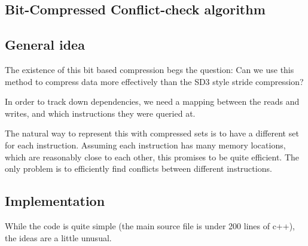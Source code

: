 \documentclass[12pt,twoside]{reedthesis}
\begin{document}
	\subsection{Bit-Compressed Conflict-check algorithm}

		\subsection{General idea}

		The existence of this bit based compression begs the question: Can we use this method to compress data more effectively than the SD3 style stride compression?

		In order to track down dependencies, we need a mapping between the reads and writes, and which instructions they were queried at.

		The natural way to represent this with compressed sets is to have a different set for each instruction. Assuming each instruction has many memory locations, which are reasonably close to each other, this promises to be quite efficient. The only problem is to efficiently find conflicts between different instructions.

		\subsection{Implementation}

		While the code is quite simple (the main source file is under 200 lines of c++), the ideas are a little unusual.
\end{document}
